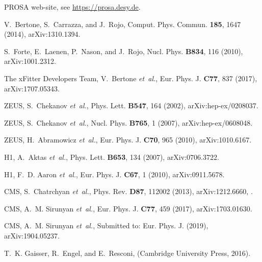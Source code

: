 \documentclass[12pt]{article}
\begin{document}
\begin{thebibliography}{99}
{PROSA} web-site,
\newblock see \url{https://prosa.desy.de}.

V.~Bertone, S.~Carrazza, and J.~Rojo,
\newblock Comput. Phys. Commun. {\bf 185}, 1647 (2014), arXiv:1310.1394.

S.~Forte, E.~Laenen, P.~Nason, and J.~Rojo,
\newblock Nucl. Phys. {\bf B834}, 116 (2010), arXiv:1001.2312.

The xFitter Developers Team, V.~Bertone {\em et~al.},
\newblock Eur. Phys. J. {\bf C77}, 837 (2017), arXiv:1707.05343.

ZEUS, S.~Chekanov {\em et~al.},
\newblock Phys. Lett. {\bf B547}, 164 (2002), arXiv:hep-ex/0208037.

ZEUS, S.~Chekanov {\em et~al.},
\newblock Nucl. Phys. {\bf B765}, 1 (2007), arXiv:hep-ex/0608048.

ZEUS, H.~Abramowicz {\em et~al.},
\newblock Eur. Phys. J. {\bf C70}, 965 (2010), arXiv:1010.6167.

H1, A.~Aktas {\em et~al.},
\newblock Phys. Lett. {\bf B653}, 134 (2007), arXiv:0706.3722.

H1, F.~D. Aaron {\em et~al.},
\newblock Eur. Phys. J. {\bf C67}, 1 (2010), arXiv:0911.5678.

CMS, S.~Chatrchyan {\em et~al.},
\newblock Phys. Rev. {\bf D87}, 112002 (2013), arXiv:1212.6660,
.

CMS, A.~M. Sirunyan {\em et~al.},
\newblock Eur. Phys. J. {\bf C77}, 459 (2017), arXiv:1703.01630.

CMS, A.~M. Sirunyan {\em et~al.},
\newblock Submitted to: Eur. Phys. J.  (2019), arXiv:1904.05237.

T.~K. Gaisser, R.~Engel, and E.~Resconi,
 (Cambridge University Press,
  2016).


\end{thebibliography}
\end{document}
